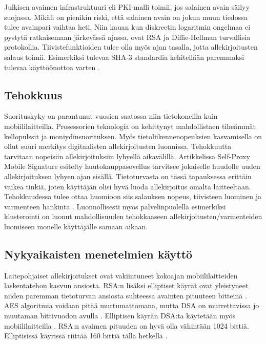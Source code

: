 \documentclass[finnish]{tktltiki2}
\theoremstyle{definition}
\theoremstyle{remark}
\begin{document}
Julkisen avaimen infrastruktuuri eli PKI-malli toimii, jos salainen avain säilyy suojassa. Mikäli on pienikin riski, että salainen avain on jokun muun tiedossa tulee avainpari vaihtaa heti. Niin kauan kun diskreetin logaritmin ongelmaa ei pystytä ratkaisemaan järkevässä ajassa, ovat RSA ja Diffie-Hellman turvallisia protokollia. Tiivistefunktioiden tulee olla myös ajan tasalla, jotta allekirjoitusten salaus toimii. Esimerkiksi tulevaa SHA-3 standardia kehitellään paremmaksi tulevaa käyttöönottoa varten \cite{nist}.
	  

\subsection{Tehokkuus}

Suorituskyky on parantunut vuosien saatossa niin tietokoneilla kuin mobiililaitteilla. Prosessorien teknologia on kehittynyt mahdollistaen tiheämmät kellopulssit ja moniydinsuorituksen. Myös tietoliikennenopeuksien kasvamisella on ollut suuri merkitys digitaalisten allekirjoitusten luonnissa. Tehokkuutta tarvitaan nopeisiin allekirjoituksiin lyhyellä aikavälillä. Artikkelissa Self-Proxy Mobile Signature \cite{proxy} esitelty huutokauppasovellus tarvitsee jokaiselle huudolle uuden  allekirjoituksen lyhyen ajan sisällä. Tietoturvasta on tässä tapauksessa erittäin vaikea tinkiä, joten käyttäjän olisi hyvä luoda allekirjoitus omalta laitteeltaan. Tehokkuudessa tulee ottaa huomioon siis salauksen nopeus, tiivisteen luominen ja varmenteen hankinta \cite{proxy}. Luonnollisesti myös palvelinpuolella esimerkiksi klusterointi on luonut mahdollisuuden tehokkaaseen allekirjoitusten/varmenteiden luomiseen monelle käyttäjälle samaan aikaan.

\subsection{Nykyaikaisten menetelmien käyttö}

Laitepohjaiset allekirjoitukset ovat vakiintuneet kokoajan mobiililaitteiden laskentatehon kasvun ansiosta. RSA:n lisäksi elliptiset käyrät ovat yleistyneet niiden paremman tietoturvan ansiosta suhteessa avainten pituuteen bitteinä \cite{ECC}. AES algoritmia voidaan pitää murtumattomana, mutta DSA on murrettavissa jo muutaman bittivuodon avulla \cite{gsm}. Elliptisen käyrän DSA:ta käytetään myös mobiililaitteilla \cite{webs}. RSA:n avaimen pituuden on hyvä olla vähintään 1024 bittiä. Elliptisissä käyrissä riittää 160 bittiä tällä hetkellä \cite{ECC}.
\end{document}
